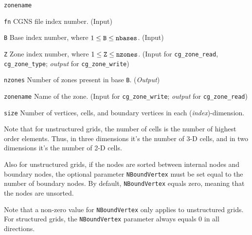 \begin{Ventryi}{\texttt{zonename}}\raggedright
\item [\texttt{fn}]
      CGNS file index number.
      (\textcolor{input}{Input})
\item [\texttt{B}]
      Base index number, where $1 \leq \text{\texttt{B}} \leq \text{\texttt{nbases}}$.
      (\textcolor{input}{Input})
\item [\texttt{Z}]
      Zone index number, where $1 \leq \text{\texttt{Z}} \leq \text{\texttt{nzones}}$.
      (\textcolor{input}{Input} for \texttt{cg\_zone\_read},
      \texttt{cg\_zone\_type}; \textcolor{output}{\textit{output}} for
      \texttt{cg\_zone\_write})
\item [\texttt{nzones}]
      Number of zones present in base \texttt{B}.
      (\textcolor{output}{\textit{Output}})
\item [\texttt{zonename}]
      Name of the zone.
      (\textcolor{input}{Input} for \texttt{cg\_zone\_write};
      \textcolor{output}{\textit{output}} for \texttt{cg\_zone\_read})
\item [\texttt{size}]
      Number of vertices, cells, and boundary vertices in each
      (\textit{index})-dimension.

      Note that for unstructured grids, the number of cells is the
      number of highest order elements.
      Thus, in three dimensions it's the number of 3-D cells, and in
      two dimensions it's the number of 2-D cells.

      Also for unstructured grids, if the nodes are sorted between
      internal nodes and boundary nodes, the optional parameter
      \texttt{NBoundVertex} must be set equal to the number of boundary
      nodes.
      By default, \texttt{NBoundVertex} equals zero, meaning that the
      nodes are unsorted.

      Note that a non-zero value for \texttt{NBoundVertex} only applies
      to unstructured grids.
      For structured grids, the \texttt{NBoundVertex} parameter always
      equals 0 in all directions.


\end{Ventryi}
